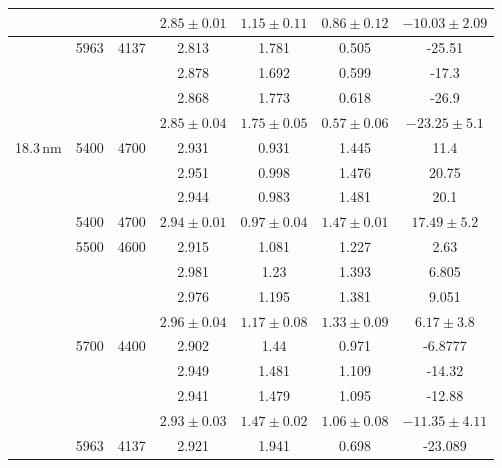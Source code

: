 \documentclass{article}
\begin{document}
\begin{table}
\begin{tabular}{|c|c|c|c|c|c|c|}
     \hline
              &      &             & $2.85 \pm 0.01$ & $1.15 \pm 0.11$ & $0.86 \pm 0.12$ & $-10.03\pm 2.09$ \\
     \hline
              &5963 & 4137         & 2.813        & 1.781        & 0.505       & -25.51  \\
              &     &              & 2.878        & 1.692        & 0.599       & -17.3   \\
              &     &              & 2.868        & 1.773        & 0.618       & -26.9   \\
     \hline
              &     &              & $2.85 \pm 0.04$ & $1.75 \pm 0.05$ & $0.57 \pm 0.06$ & $-23.25\pm 5.1$ \\
      \hline

      18.3\,nm  &5400 & 4700         & 2.931        & 0.931        & 1.445      & 11.4    \\
              &     &              & 2.951        & 0.998        & 1.476      & 20.75   \\
              &     &              & 2.944        & 0.983        & 1.481      & 20.1    \\
      \hline
              &5400 & 4700 & $2.94 \pm 0.01$ & $0.97 \pm 0.04$ & $1.47 \pm 0.01$ & $17.49 \pm 5.2$ \\
       \hline      
              &5500 & 4600         & 2.915        & 1.081        & 1.227      & 2.63    \\
              &     &              & 2.981        & 1.23         & 1.393      & 6.805   \\
              &     &              & 2.976        & 1.195        & 1.381      & 9.051   \\
       \hline
              &     &  & $2.96 \pm 0.04$ & $1.17 \pm 0.08$ & $1.33 \pm 0.09$ & $6.17  \pm 3.8$ \\
        \hline
              &5700 & 4400         & 2.902        & 1.44         & 0.971      & -6.8777 \\
              &     &              & 2.949        & 1.481        & 1.109      & -14.32  \\
              &     &              & 2.941        & 1.479        & 1.095      & -12.88  \\
        \hline
              &     &  & $2.93 \pm 0.03$ & $1.47 \pm 0.02$ & $1.06 \pm 0.08$ & $-11.35\pm4.11$ \\
        \hline
              &5963 & 4137         & 2.921        & 1.941        & 0.698      & -23.089  \\

\end{tabular}
\end{table}
\end{document}
